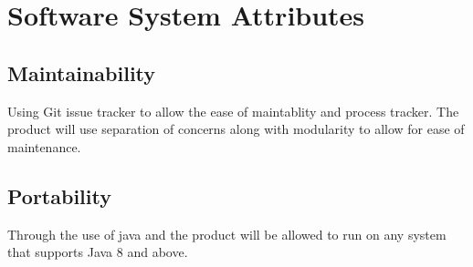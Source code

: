 \documentclass{article}
\begin{document}
\section{Software System Attributes}
\subsection{Maintainability}
Using Git issue tracker to allow the ease of maintablity and process tracker. The product will use separation of concerns along with modularity to allow for ease of maintenance.
\subsection{Portability}
Through the use of java and the product will be allowed to run on any system that supports Java 8 and above.
\end{document}
